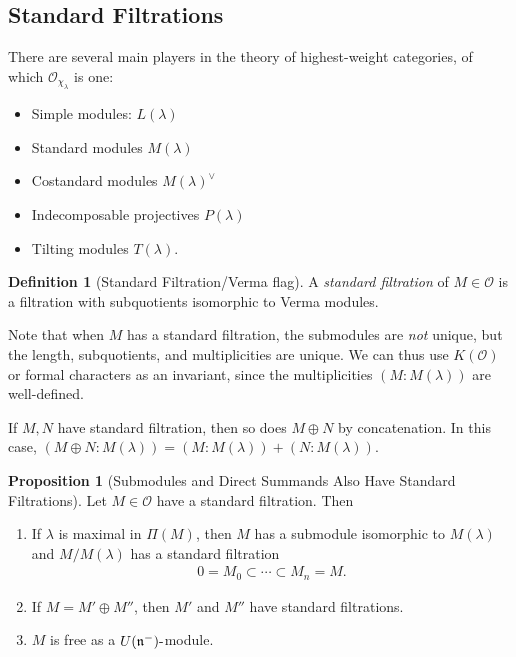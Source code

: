 \documentclass[11pt]{scrartcl}
\theoremstyle{definition}
\theoremstyle{theorem}
\newtheorem{proposition}[theorem]{Proposition}
\theoremstyle{proof}
\theoremstyle{definition}
\newtheorem{definition}{Definition}[theorem]
\theoremstyle{break}
\theoremstyle{problem}
\providecommand{\tightlist}{%
  \setlength{\itemsep}{0pt}\setlength{\parskip}{0pt}}
\newcommand{\dash}[0]{{\hbox{-}}}
\newcommand{\dual}[0]{^\vee}
\newcommand{\lien}[0]{{\mathfrak{n}}}
\newcommand{\OO}[0]{{\mathcal{O}}}
\begin{document}
\hypertarget{standard-filtrations}{%
\subsection{Standard Filtrations}\label{standard-filtrations}}

There are several main players in the theory of highest-weight
categories, of which \(\OO_{\chi_\lambda}\) is one:

\begin{itemize}
\tightlist
\item
  Simple modules: \(L(\lambda)\)
\item
  Standard modules \(M(\lambda)\)
\item
  Costandard modules \(M(\lambda)\dual\)
\item
  Indecomposable projectives \(P(\lambda)\)
\item
  Tilting modules \(T(\lambda)\).
\end{itemize}

\begin{definition}[Standard Filtration/Verma flag]

A \emph{standard filtration} of \(M\in \OO\) is a filtration with
subquotients isomorphic to Verma modules.\end{definition}

Note that when \(M\) has a standard filtration, the submodules are
\emph{not} unique, but the length, subquotients, and multiplicities are
unique. We can thus use \(K(\OO)\) or formal characters as an invariant,
since the multiplicities \((M: M(\lambda))\) are well-defined.

If \(M, N\) have standard filtration, then so does \(M \oplus N\) by
concatenation. In this case,
\((M\oplus N: M(\lambda)) = (M:M(\lambda)) + (N: M(\lambda))\).

\begin{proposition}[Submodules and Direct Summands Also Have Standard Filtrations]

Let \(M\in \OO\) have a standard filtration. Then

\begin{enumerate}
\def\labelenumi{\alph{enumi}.}
\tightlist
\item
  If \(\lambda\) is maximal in \(\Pi(M)\), then \(M\) has a submodule
  isomorphic to \(M(\lambda)\) and \(M/M(\lambda)\) has a standard
  filtration
  \begin{align*}0 = M_0 \subset \cdots \subset M_n = M.\end{align*}
\item
  If \(M = M' \oplus M''\), then \(M'\) and \(M''\) have standard
  filtrations.
\item
  \(M\) is free as a \(U(\lien^-)\dash\)module.
\end{enumerate}

\end{proposition}
\end{document}
